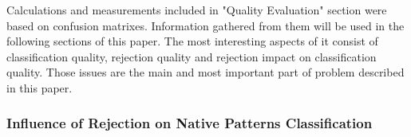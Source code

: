 \documentclass{llncs}
\begin{document}
Calculations and measurements included in "Quality Evaluation" section were based on confusion matrixes. Information gathered from them will be used in the following sections of this paper. The most interesting aspects of it consist of classification quality, rejection quality and rejection impact on classification quality. Those issues are the main and most important part of problem described in this paper.

\subsubsection{Influence of Rejection on Native Patterns Classification}

\end{document}
